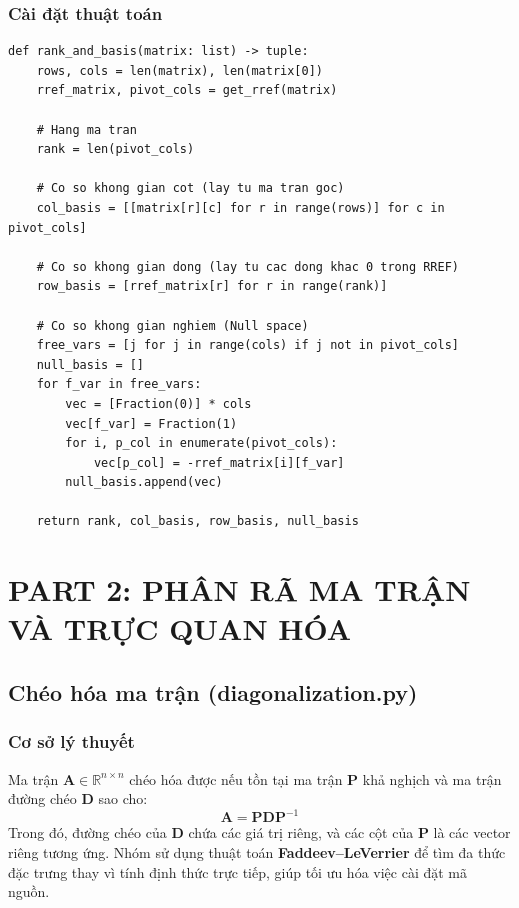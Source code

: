 \documentclass[a4paper,12pt]{article}
\begin{document}
\subsubsection{Cài đặt thuật toán}
\begin{lstlisting}[caption=Mã nguồn trích xuất hạng và cơ sở không gian]
def rank_and_basis(matrix: list) -> tuple:
    rows, cols = len(matrix), len(matrix[0])
    rref_matrix, pivot_cols = get_rref(matrix)

    # Hang ma tran
    rank = len(pivot_cols)

    # Co so khong gian cot (lay tu ma tran goc)
    col_basis = [[matrix[r][c] for r in range(rows)] for c in pivot_cols]
    
    # Co so khong gian dong (lay tu cac dong khac 0 trong RREF)
    row_basis = [rref_matrix[r] for r in range(rank)]

    # Co so khong gian nghiem (Null space)
    free_vars = [j for j in range(cols) if j not in pivot_cols]
    null_basis = []
    for f_var in free_vars:
        vec = [Fraction(0)] * cols
        vec[f_var] = Fraction(1)
        for i, p_col in enumerate(pivot_cols):
            vec[p_col] = -rref_matrix[i][f_var]
        null_basis.append(vec)

    return rank, col_basis, row_basis, null_basis
\end{lstlisting}

\section{PART 2: PHÂN RÃ MA TRẬN VÀ TRỰC QUAN HÓA}

\subsection{Chéo hóa ma trận (diagonalization.py)}

\subsubsection{Cơ sở lý thuyết}
Ma trận $\mathbf{A} \in \mathbb{R}^{n \times n}$ chéo hóa được nếu tồn tại ma trận $\mathbf{P}$ khả nghịch và ma trận đường chéo $\mathbf{D}$ sao cho:
\begin{equation}
    \mathbf{A} = \mathbf{P}\mathbf{D}\mathbf{P}^{-1}
\end{equation}
Trong đó, đường chéo của $\mathbf{D}$ chứa các giá trị riêng, và các cột của $\mathbf{P}$ là các vector riêng tương ứng. Nhóm sử dụng thuật toán \textbf{Faddeev--LeVerrier} để tìm đa thức đặc trưng thay vì tính định thức trực tiếp, giúp tối ưu hóa việc cài đặt mã nguồn.
\end{document}
